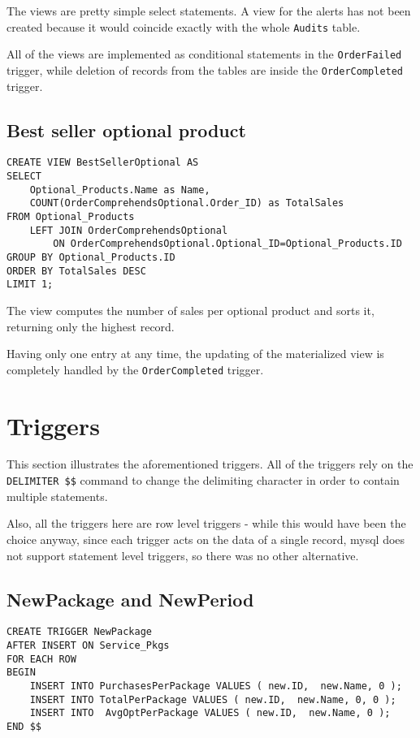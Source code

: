 The views are pretty simple select statements. A view for the alerts has not been created because it would coincide exactly with the
whole \texttt{Audits} table.

All of the views are implemented as conditional statements in the \texttt{OrderFailed}  trigger, while deletion of records from the tables are
inside the \texttt{OrderCompleted} trigger.

\subsection{Best seller optional product}

\begin{lstlisting}[style=SQL]
CREATE VIEW BestSellerOptional AS
SELECT
    Optional_Products.Name as Name,
    COUNT(OrderComprehendsOptional.Order_ID) as TotalSales
FROM Optional_Products
    LEFT JOIN OrderComprehendsOptional
        ON OrderComprehendsOptional.Optional_ID=Optional_Products.ID
GROUP BY Optional_Products.ID
ORDER BY TotalSales DESC
LIMIT 1;
\end{lstlisting}

The view computes the number of sales per optional product and sorts it, returning only the highest record.

Having only one entry at any time, the updating of the materialized view is completely handled by the \texttt{OrderCompleted} trigger.


\section{Triggers}
\label{sec:triggers}

This section illustrates the aforementioned triggers. All of the triggers rely on the \texttt{DELIMITER \$\$} command to change the delimiting character in order to contain multiple statements.

Also, all the triggers here are row level triggers - while this would have been the choice anyway, since each trigger acts on the data of a single record, mysql does not support statement level triggers, so there was no other alternative.

\subsection {NewPackage and NewPeriod}


\begin{lstlisting}[style=SQL]
CREATE TRIGGER NewPackage
AFTER INSERT ON Service_Pkgs
FOR EACH ROW
BEGIN
    INSERT INTO PurchasesPerPackage VALUES ( new.ID,  new.Name, 0 );
    INSERT INTO TotalPerPackage VALUES ( new.ID,  new.Name, 0, 0 );
    INSERT INTO  AvgOptPerPackage VALUES ( new.ID,  new.Name, 0 );
END $$
\end{lstlisting}

